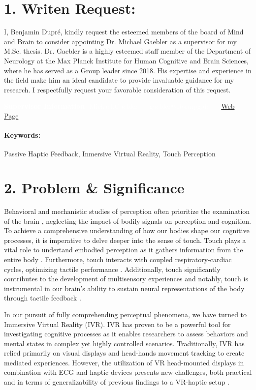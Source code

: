 \documentclass[12pt,oneside,openright]{report}
\makeatletter
\newcommand{\supervisor}{Michael,Gaebler --- gaebler@cbs.mpg.de --- \href{https://www.cbs.mpg.de/person/gaebler/371395}{Web Page}.

}
\newcommand{\skills}{Passive Haptic Feedback, Inmersive Virtual Reality, Touch Perception}
\makeatother
\begin{document}
\section*{1. Writen Request:}
I, Benjamin Dupré, kindly request the esteemed members of the board of Mind and Brain to consider appointing Dr. Michael Gaebler as a supervisor for my M.Sc. thesis. Dr. Gaebler is a highly esteemed staff member of the Department of Neurology at the Max Planck Institute for Human Cognitive and Brain Sciences, where he has served as a Group leader since 2018. His expertise and experience in the field make him an ideal candidate to provide invaluable guidance for my research. I respectfully request your favorable consideration of this request.

\vspace*{0,5cm}

{\colorbox{boxcl}{\parbox[b][][r]{0.85\textwidth}{\textcolor{white}{\textbf{Supervisor Information:} \supervisor}}}}

\paragraph{\textbf{Keywords:}}\skills{}


\section*{2. Problem \& Significance}

Behavioral and mechanistic studies of perception often prioritize the examination of the brain \cite{Hofmann2021}, neglecting the impact of bodily signals on perception and cognition. To achieve a comprehensive understanding of how our bodies shape our cognitive processes, it is imperative to delve deeper into the sense of touch. Touch plays a vital role to undertand embodied perception as it gathers information from the entire body \cite*{Field2014}.  Furthermore, touch interacts with coupled respiratory-cardiac cycles, optimizing tactile performance \cite{Grund643}.  Additionally, touch significantly contributes to the development of multisensory experiences \cite{BREMNER2017227} and notably, touch is instrumental in our brain's ability to sustain neural representations of the body through tactile feedback \cite{Cole2016}.

In our pursuit of fully comprehending perceptual phenomena, we have turned to Immersive Virtual Reality (IVR). IVR has proven to be a powerful tool for investigating cognitive processes as it enables researchers to assess behaviors and mental states in complex yet highly controlled scenarios. Traditionally, IVR has relied primarily on visual displays and head-hands movement tracking to create mediated experiences. However, the utilization of VR head-mounted displays in combination with ECG and haptic devices presents new challenges, both practical and in terms of generalizability of previous findings to a VR-haptic setup \cite*{Klotzsche2023}.
\end{document}
